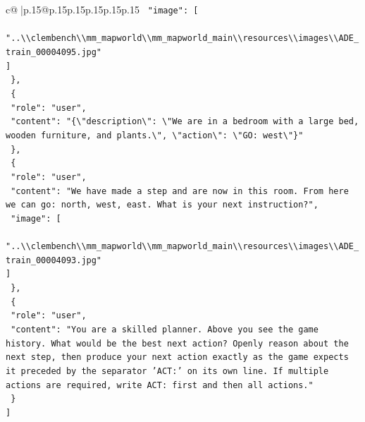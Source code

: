 \documentclass{article}
\begin{document}
{\begin{supertabular}{c@{$\;$}|p{.15\linewidth}@{}p{.15\linewidth}p{.15\linewidth}p{.15\linewidth}p{.15\linewidth}p{.15\linewidth}}
{{{\texttt{    "image": {[}} \\
\texttt{      "..\textbackslash{}\textbackslash{}clembench\textbackslash{}\textbackslash{}mm\_mapworld\textbackslash{}\textbackslash{}mm\_mapworld\_main\textbackslash{}\textbackslash{}resources\textbackslash{}\textbackslash{}images\textbackslash{}\textbackslash{}ADE\_train\_00004095.jpg"} \\
\texttt{    {]}} \\
\texttt{  \},} \\
\texttt{  \{} \\
\texttt{    "role": "user",} \\
\texttt{    "content": "\{\textbackslash{}"description\textbackslash{}": \textbackslash{}"We are in a bedroom with a large bed, wooden furniture, and plants.\textbackslash{}", \textbackslash{}"action\textbackslash{}": \textbackslash{}"GO: west\textbackslash{}"\}"} \\
\texttt{  \},} \\
\texttt{  \{} \\
\texttt{    "role": "user",} \\
\texttt{    "content": "We have made a step and are now in this room. From here we can go: north, west, east. What is your next instruction?",} \\
\texttt{    "image": {[}} \\
\texttt{      "..\textbackslash{}\textbackslash{}clembench\textbackslash{}\textbackslash{}mm\_mapworld\textbackslash{}\textbackslash{}mm\_mapworld\_main\textbackslash{}\textbackslash{}resources\textbackslash{}\textbackslash{}images\textbackslash{}\textbackslash{}ADE\_train\_00004093.jpg"} \\
\texttt{    {]}} \\
\texttt{  \},} \\
\texttt{  \{} \\
\texttt{    "role": "user",} \\
\texttt{    "content": "You are a skilled planner. Above you see the game history. What would be the best next action? Openly reason about the next step, then produce your next action exactly as the game expects it preceded by the separator 'ACT:' on its own line. If multiple actions are required, write ACT: first and then all actions."} \\
\texttt{  \}} \\
\texttt{{]}} \\
            }
        }
    }
     \\ \\


\end{supertabular}}
\end{document}
